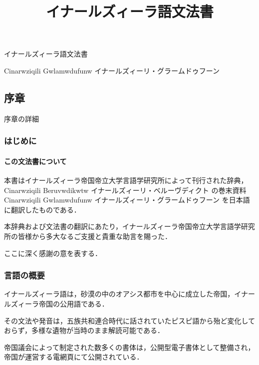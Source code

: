 \documentclass[
  japanese,
]{article}
\title{イナールズィーラ語文法書}
\author{}
\date{}
\begin{document}
\maketitle

{
\setcounter{tocdepth}{3}
\tableofcontents
}
\section{}\label{section}

イナールズィーラ語文法書

{Cinarwziqili Gwlamwdufunw} イナールズィーリ・グラームドゥフーン

\subsection{序章}\label{chapter1}

序章の詳細

\subsubsection{はじめに}\label{section1.1}

\paragraph{この文法書について}\label{subsection1.1.1}

本書はイナールズィーラ帝国帝立大学言語学研究所によって刊行された辞典，{Cinarwziqili
Beruvwdikwtw} イナールズィーリ・ベルーヴディクト の巻末資料{Cinarwziqili
Gwlamwdufunw} イナールズィーリ・グラームドゥフーン
を日本語に翻訳したものである．

本辞典および文法書の翻訳にあたり，イナールズィーラ帝国帝立大学言語学研究所の皆様から多大なるご支援と貴重な助言を賜った．

ここに深く感謝の意を表する．

\subsubsection{言語の概要}\label{section1.2}

イナールズィーラ語は，砂漠の中のオアシス都市を中心に成立した帝国，イナールズィーラ帝国の公用語である．

その文法や発音は，五族共和連合時代に話されていたピスピ語から殆ど変化しておらず，多様な遺物が当時のまま解読可能である．

帝国議会によって制定された数多くの書体は，公開型電子書体として整備され，帝国が運営する電網頁にて公開されている．
\end{document}
